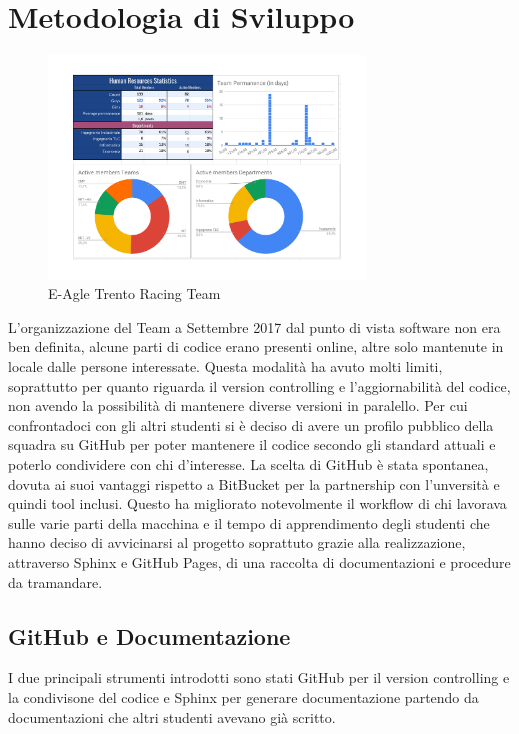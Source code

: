 \chapter{Metodologia di Sviluppo}

\begin{figure}[!hbt]
  \centering
  \includegraphics[width=0.75\textwidth]{./figures/membri.png}
  \caption{E-Agle Trento Racing Team}
\end{figure}

L'organizzazione del Team a Settembre 2017 dal punto di vista software non era ben definita, 
alcune parti di codice erano presenti online, altre solo mantenute in locale dalle persone interessate.
Questa modalità ha avuto molti limiti, soprattutto per quanto riguarda il version controlling e l'aggiornabilità del codice, 
non avendo la possibilità di mantenere diverse versioni in paralello.
Per cui confrontadoci con gli altri studenti si è deciso di avere un profilo pubblico della squadra su GitHub per poter mantenere il codice
secondo gli standard attuali e poterlo condividere con chi d'interesse. La scelta di GitHub è stata spontanea, dovuta ai suoi vantaggi rispetto
a BitBucket per la partnership con l'unversità e quindi tool inclusi.
Questo ha migliorato notevolmente il workflow di chi lavorava sulle varie parti della macchina e il tempo di apprendimento degli studenti che hanno deciso di avvicinarsi al progetto
soprattuto grazie alla realizzazione, attraverso Sphinx e GitHub Pages, di una raccolta di documentazioni e procedure da tramandare. 

\newpage

\section{GitHub e Documentazione}

I due principali strumenti introdotti sono stati GitHub per il version controlling e 
la condivisone del codice e Sphinx per generare documentazione partendo da documentazioni che altri studenti avevano già scritto.

